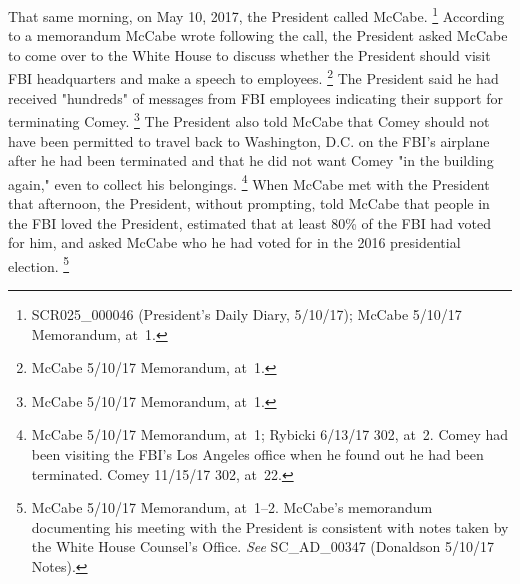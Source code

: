 {That same morning, on May 10, 2017, the President called McCabe.%
\footnote{SCR025\_000046 (President's Daily Diary, 5/10/17);
McCabe 5/10/17 Memorandum, at~1.}
According to a memorandum McCabe wrote following the call, the President asked McCabe to come over to the White House to discuss whether the President should visit FBI headquarters and make a speech to employees.%
\footnote{McCabe 5/10/17 Memorandum, at~1.}
The President said he had received "hundreds" of messages from FBI employees indicating their support for terminating Comey.%
\footnote{McCabe 5/10/17 Memorandum, at~1.}
The President also told McCabe that Comey should not have been permitted to travel back to Washington, D.C. on the FBI's airplane after he had been terminated and that he did not want Comey "in the building again," even to collect his belongings.%
\footnote{McCabe 5/10/17 Memorandum, at~1;
Rybicki 6/13/17 302, at~2.
Comey had been visiting the FBI's Los Angeles office when he found out he had been terminated.
Comey 11/15/17 302, at~22.}
When McCabe met with the President that afternoon, the President, without prompting, told McCabe that people in the FBI loved the President, estimated that at least 80\% of the FBI had voted for him, and asked McCabe who he had voted for in the 2016 presidential election.%
\footnote{McCabe 5/10/17 Memorandum, at~1--2.
McCabe's memorandum documenting his meeting with the President is consistent with notes taken by the White House Counsel's Office.
\textit{See} SC\_AD\_00347 (Donaldson 5/10/17 Notes).}

}
